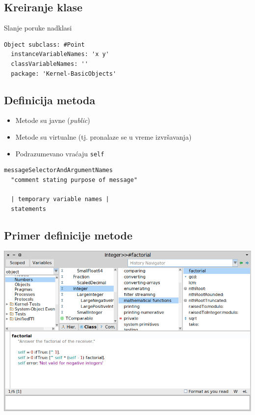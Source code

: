 \documentclass[presentation]{beamer}
\begin{document}
\subsection{Kreiranje klase}
\label{sec:orgd32ba50}

Slanje poruke nadklasi

\begin{verbatim}
Object subclass: #Point
  instanceVariableNames: 'x y'
  classVariableNames: ''
  package: 'Kernel-BasicObjects'
\end{verbatim}

\subsection{Definicija metoda}
\label{sec:org1750fae}

\begin{itemize}
\item Metode su javne (\emph{public})
\item Metode su virtualne (tj. pronalaze se u vreme izvršavanja)
\item Podrazumevano vraćaju \texttt{self}
\end{itemize}

\begin{verbatim}
messageSelectorAndArgumentNames
  "comment stating purpose of message"
  
  | temporary variable names |
  statements
\end{verbatim}

\subsection{Primer definicije metode}
\label{sec:orgb755aa5}

\begin{center}
\includegraphics[width=.9\linewidth]{./slike/method_definition.png}
\end{center}
\end{document}
